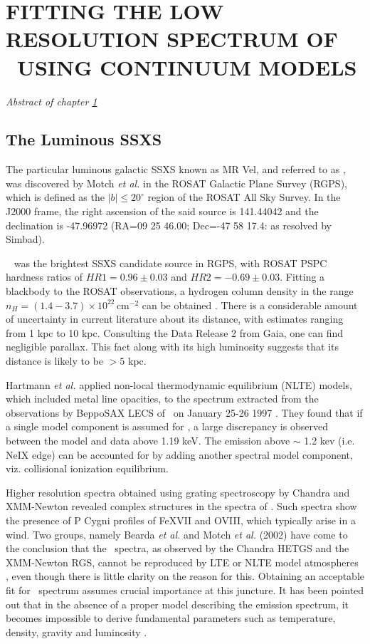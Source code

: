 \chapter{FITTING THE LOW RESOLUTION SPECTRUM OF \mrvel\ USING CONTINUUM MODELS} \label{chap:continuum}
    \minitoc
    \emph{Abstract of chapter \ref{chap:continuum}}
    
    \section{The Luminous SSXS \mrvel} \label{continuum:on-mrvel}
		The particular luminous galactic SSXS known as MR Vel, and referred to as \mrvel, was discovered by Motch \emph{et al.} \cite{motch1994} in the ROSAT Galactic Plane Survey (RGPS), which is defined as the $|b|\le 20^{\circ}$ region of the ROSAT All Sky Survey. In the J2000 frame, the right ascension of the said source is 141.44042 and the declination is -47.96972 (RA=09 25 46.00; Dec=-47 58 17.4: as resolved by Simbad).
		
		\mrvel~ was the brightest SSXS candidate source in RGPS, with ROSAT PSPC hardness ratios of $HR1=0.96\pm 0.03$ and $HR2=-0.69\pm 0.03$. Fitting a blackbody to the ROSAT observations, a hydrogen column density in the range $n_H=(1.4-3.7)\times 10^{22}\,\mathrm{cm}^{-2}$ can be obtained \cite{motch1994}. There is a considerable amount of uncertainty in current literature about its distance, with estimates ranging from  1 kpc to 10 kpc. Consulting the Data Release 2 from Gaia, one can find negligible parallax. This fact along with its high luminosity suggests that its distance is likely to be $>5$ kpc.
		
		Hartmann \emph{et al.} applied non-local thermodynamic equilibrium (NLTE) models, which included metal line opacities, to the spectrum extracted from the observations by BeppoSAX LECS of \mrvel~on January 25-26 1997 \cite{hartmann99}. They found that if a single model component is assumed for \mrvel, a large discrepancy is observed between the model and data above 1.19 keV. The emission above $\sim$ 1.2 kev (i.e. NeIX edge) can be accounted for by adding another spectral model component, viz. collisional ionization equilibrium.
		
		Higher resolution spectra obtained using grating spectroscopy by Chandra and XMM-Newton revealed complex structures in the spectra of \mrvel. Such spectra show the presence of P Cygni profiles of FeXVII and OVIII, which typically arise in a wind. Two groups, namely Bearda \emph{et al.} and Motch \emph{et al.} (2002) have come to the conclusion that the \mrvel~spectra, as observed by the Chandra HETGS and the XMM-Newton RGS, cannot be reproduced by LTE or NLTE model atmospheres \cite{bearda2002,motch2002}, even though there is little clarity on the reason for this. Obtaining an acceptable fit for \mrvel~spectrum assumes crucial importance at this juncture. It has been pointed out that in the absence of a proper model describing the emission spectrum, it becomes impossible to derive fundamental parameters such as temperature, density, gravity and luminosity \cite{motch2002}.
		
